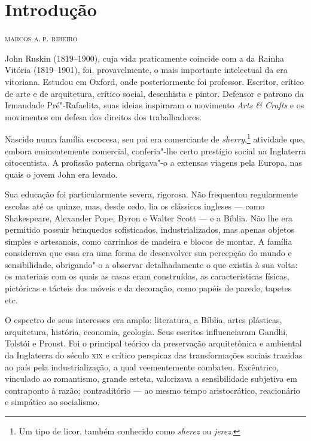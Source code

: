 \newcommand{\subtitulo}[1]{\NoCaseChange{\textnormal{\break\Large\itshape#1}}}
\chapter*{Introdução\smallskip\subtitulo{Um testamento literário escrito\\ao longo de 27 anos}}

\begin{flushright}
\textsc{marcos a.\,p. ribeiro}
\end{flushright}\medskip

\noindent{}John Ruskin (1819--1900), cuja vida praticamente coincide com a da Rainha
Vitória (1819--1901), foi, provavelmente, o mais importante intelectual da
era vitoriana. Estudou em Oxford, onde posteriormente foi professor.
Escritor, crítico de arte e de arquitetura, crítico social, desenhista e
pintor. Defensor e patrono da Irmandade Pré"-Rafaelita, suas ideias
inspiraram o movimento \textit{Arts \& Crafts} e os movimentos em defesa
dos direitos dos trabalhadores.

Nascido numa família escocesa, seu pai era comerciante de \textit{sherry},\footnote{Um tipo de licor, também conhecido como \textit{sherez} ou \textit{jerez}.} atividade que, embora eminentemente comercial, conferia"-lhe
certo prestígio social na Inglaterra oitocentista. A profissão paterna
obrigava"-o a extensas viagens pela Europa, nas quais o jovem John era
levado. 

Sua educação foi particularmente severa, rigorosa. Não
frequentou regularmente escolas até os quinze, mas, desde cedo, lia os
clássicos ingleses --- como Shakespeare, Alexander Pope, Byron e Walter Scott --- e
a Bíblia. Não lhe era permitido possuir brinquedos sofisticados,
industrializados, mas apenas objetos simples e artesanais, como
carrinhos de madeira e blocos de montar. A família considerava que essa
era uma forma de desenvolver sua percepção do mundo e sensibilidade,
obrigando"-o a observar detalhadamente o que existia à sua volta: os
materiais com os quais as casas eram construídas, as características
físicas, pictóricas e tácteis dos móveis e da decoração, como papéis de
parede, tapetes etc.

O espectro de seus interesses era amplo: literatura, a Bíblia, artes
plásticas, arquitetura, história, economia, geologia. Seus escritos
influenciaram Gandhi, Tolstói e Proust. Foi o principal teórico da
preservação arquitetônica e ambiental da Inglaterra do século \textsc{xix} e
crítico perspicaz das transformações sociais trazidas ao país pela
industrialização, a qual veementemente combateu. Excêntrico, vinculado
ao romantismo, grande esteta, valorizava a sensibilidade subjetiva em
contraponto à razão; contraditório --- ao mesmo tempo aristocrático,
reacionário e simpático ao socialismo.


